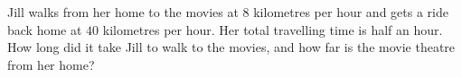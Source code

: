 Jill walks from her home to the movies at $8$ kilometres per hour and gets a ride back home at $40$ kilometres per hour. Her total travelling time is half an hour. How long did it take Jill to walk to the movies, and how far is the movie theatre from her home?
